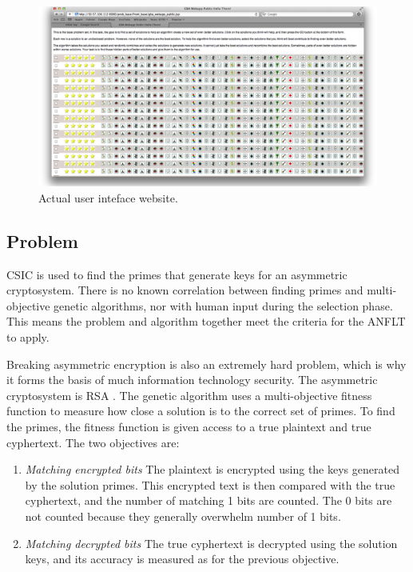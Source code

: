 \begin{figure}[!t]
  \centering
  \includegraphics[width=4.5in]{HollowayWebsiteUI}
  \caption{Actual user inteface website.}
  \label{fig:website_UI}
\end{figure}

\subsection{Problem}\label{sec:problem}

CSIC is used to find the primes that generate keys for an asymmetric cryptosystem.  There is no known correlation between finding primes and multi-objective genetic algorithms, nor with human input during the selection phase.  This means the problem and algorithm together meet the criteria for the ANFLT to apply.  

Breaking asymmetric encryption is also an extremely hard problem, which is why it forms the basis of much information technology security.  The asymmetric cryptosystem is RSA \cite{cormen01:_introd_to_algor}.  The genetic algorithm uses a multi-objective fitness function to measure how close a solution is to the correct set of primes.  To find the primes, the fitness function is given access to a true plaintext and true cyphertext. The two objectives are:

\begin{enumerate}
\item \emph{Matching encrypted bits} The plaintext is encrypted using the keys generated by the solution primes.  This encrypted text is then compared with the true cyphertext, and the number of matching 1 bits are counted.  The 0 bits are not counted because they generally overwhelm number of 1 bits.

\item \emph{Matching decrypted bits} The true cyphertext is decrypted using the solution keys, and its accuracy is measured as for the previous objective.
\end{enumerate}


